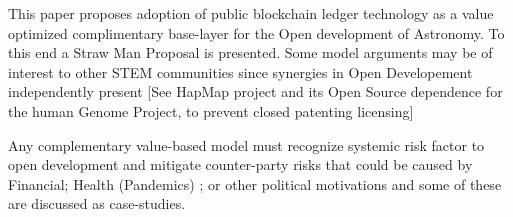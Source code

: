 \documentclass[final,5p,times,twocolumn,authoryear]{elsarticle}
\begin{document}
This paper proposes adoption of public  blockchain ledger technology as a value optimized complimentary base-layer for the Open development of Astronomy. To this end a Straw Man Proposal is presented. Some model arguments may be of interest to other STEM communities since synergies in Open Developement independently present  [See HapMap project and its Open Source dependence for the human Genome Project, \cite{GITTER2008529} to prevent closed patenting licensing]

Any complementary value-based model must recognize systemic risk factor to open development and mitigate counter-party risks that could be caused by Financial; Health (Pandemics) ; or other political motivations and some of these are discussed as case-studies. 





\end{document}
